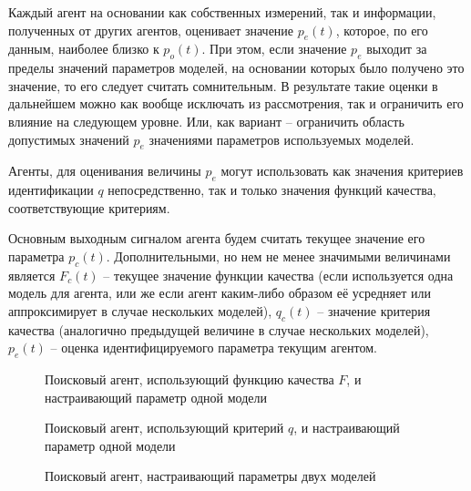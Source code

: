 Каждый агент на основании как собственных измерений, так и информации,
полученных от других агентов, оценивает значение $p_e(t)$,
которое, по его данным, наиболее близко к $p_o(t)$.
При этом, если значение $p_e$ выходит за пределы
значений параметров моделей, на основании которых
было получено это значение, то его следует считать сомнительным.
В результате такие оценки в дальнейшем можно
как вообще исключать из рассмотрения, так и ограничить
его влияние на следующем уровне.
Или, как вариант -- ограничить область допустимых
значений $p_e$ значениями параметров используемых моделей.

Агенты, для оценивания величины $p_e$
могут использовать как значения критериев идентификации $q$
непосредственно, так и только значения функций качества,
соответствующие критериям.

Основным выходным сигналом агента будем считать текущее
значение его параметра $p_c(t)$.
Дополнительными,
но нем не менее значимыми величинами является
$F_c(t)$ -- текущее значение функции качества
(если используется одна  модель для агента, или же если агент каким-либо образом её усредняет
или аппроксимирует в случае нескольких моделей),
$q_c(t)$ -- значение критерия качества (аналогично предыдущей величине в случае нескольких моделей),
$p_e(t)$ -- оценка идентифицируемого параметра текущим агентом.


\begin{figure}[htb!]
\begin{center}

\end{center}
\caption{Поисковый агент, использующий функцию качества $F$, и настраивающий параметр одной модели}
\label{atu:f:agent1}
\end{figure}


\begin{figure}[htb!]
\begin{center}

\end{center}
\caption{Поисковый агент, использующий критерий $q$, и настраивающий параметр одной модели}
\label{atu:f:agent1q}
\end{figure}


\begin{figure}[htb!]
\begin{center}

\end{center}
\caption{Поисковый агент, настраивающий параметры двух моделей}
\label{atu:f:agent2}
\end{figure}




